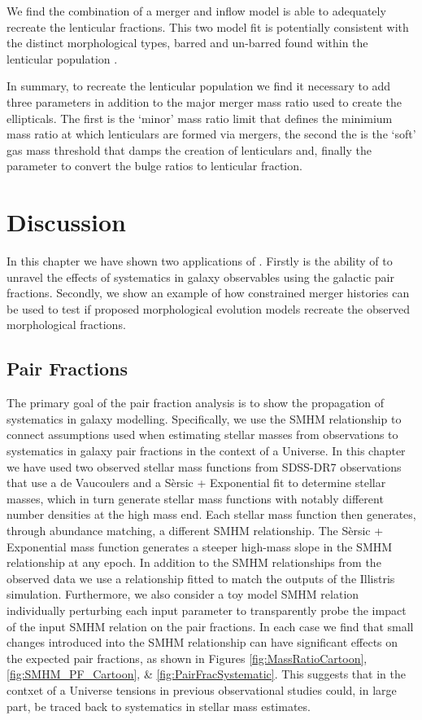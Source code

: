We find the combination of a merger and inflow model is able to adequately recreate the lenticular fractions. This two model fit is potentially consistent with the distinct morphological types, barred and un-barred found within the lenticular population \cite{Laurikainen2005MulticomponentGalaxies, VanDenBergh2012LuminositiesGalaxies}.

In summary, to recreate the lenticular population we find it necessary to add three parameters in addition to the major merger mass ratio used to create the ellipticals. The first is the `minor' mass ratio limit that defines the minimium mass ratio at which lenticulars are formed via mergers, the second the is the `soft' gas mass threshold that damps the creation of lenticulars and, finally the parameter to convert the bulge ratios to lenticular fraction. 

\section{Discussion}

In this chapter we have shown two applications of \steel. Firstly is the ability of \steel to unravel the effects of systematics in galaxy observables using the galactic pair fractions. Secondly, we show an example of how constrained merger histories can be used to test if proposed morphological evolution models recreate the observed morphological fractions.  

\subsection{Pair Fractions}

The primary goal of the pair fraction analysis is to show the propagation of systematics in galaxy modelling. 
Specifically, we use the SMHM relationship to connect assumptions used when estimating stellar masses from observations to systematics in galaxy pair fractions in the context of a \LCDM Universe. 
In this chapter we have used two observed stellar mass functions from SDSS-DR7 observations that use a de Vaucoulers and a S\`ersic + Exponential fit to determine stellar masses, which in turn generate stellar mass functions with notably different number densities at the high mass end. Each stellar mass function then generates, through abundance matching, a different SMHM relationship. The S\`ersic + Exponential mass function generates a steeper high-mass slope in the SMHM relationship at any epoch.
In addition to the SMHM relationships from the observed data we use a relationship fitted to match the outputs of the Illistris simulation. Furthermore, we also consider a toy model SMHM relation individually perturbing each input parameter to transparently probe the impact of the input SMHM relation on the pair fractions.
In each case we find that small changes introduced into the SMHM relationship can have significant effects on the expected pair fractions, as shown in Figures \ref{fig:MassRatioCartoon},\ref{fig:SMHM_PF_Cartoon}, \& \ref{fig:PairFracSystematic}.
This suggests that in the contxet of a \LCDM Universe tensions in previous observational studies could, in large part, be traced back to systematics in stellar mass estimates.

